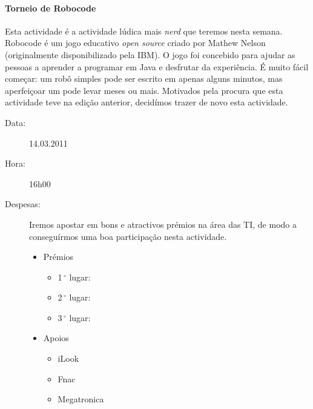 \paragraph{Torneio de Robocode}
Esta actividade é a actividade lúdica mais \emph{nerd} que teremos nesta semana.
Robocode é um jogo educativo \emph{open source} criado por Mathew Nelson (originalmente disponibilizado pela IBM).
O jogo foi concebido para ajudar as pessoas a aprender a programar em Java e desfrutar da experiência. É muito fácil começar: um robô simples pode ser escrito em apenas alguns minutos, mas aperfeiçoar um pode levar meses ou mais.
Motivados pela procura que esta actividade teve na edição anterior, decidímos trazer de novo esta actividade.
\begin{description}
\item[Data:] 14.03.2011
\item[Hora:] 16h00
\end{description}
\begin{description}
\item[Despesas:] Iremos apostar em bons e atractivos prémios na área das TI, de modo a conseguírmos uma boa participação nesta actividade.
\begin{itemize}
\item Prémios
\begin{itemize}
\item 1$\,^{\circ}$ lugar:
\item 2$\,^{\circ}$ lugar:
\item 3$\,^{\circ}$ lugar:
\end{itemize}
\item Apoios
\begin{itemize}
\item iLook
\item Fnac
\item Megatronica
\end{itemize}
\end{itemize}
\end{description}
%

